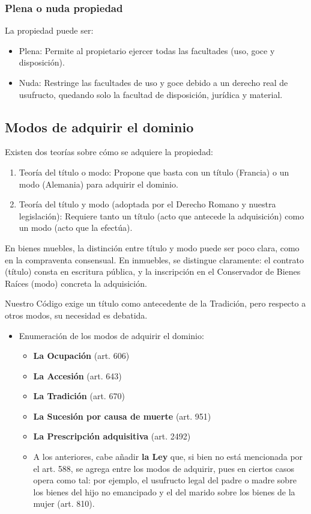 \documentclass{templateNote}
\begin{document}
\subsubsection{Plena o nuda propiedad}
La propiedad puede ser:
\begin{itemize}
    \item Plena: Permite al propietario ejercer todas las facultades (uso, goce y disposición).
    \item Nuda: Restringe las facultades de uso y goce debido a un derecho real de usufructo, quedando solo la facultad de disposición, jurídica y material.
\end{itemize}

\subsection{Modos de adquirir el dominio}

Existen dos teorías sobre cómo se adquiere la propiedad:  

\begin{enumerate}
    \item Teoría del título o modo: Propone que basta con un título (Francia) o un modo (Alemania) para adquirir el dominio.  
    \item Teoría del título y modo (adoptada por el Derecho Romano y nuestra legislación): Requiere tanto un título (acto que antecede la adquisición) como un modo (acto que la efectúa).  
\end{enumerate}

En bienes muebles, la distinción entre título y modo puede ser poco clara, como en la compraventa consensual. En inmuebles, se distingue claramente: el contrato (título) consta en escritura pública, y la inscripción en el Conservador de Bienes Raíces (modo) concreta la adquisición.  

Nuestro Código exige un título como antecedente de la Tradición, pero respecto a otros modos, su necesidad es debatida.

\begin{itemize}
    \item Enumeración de los modos de adquirir el dominio:
    \begin{itemize}
        \item \textbf{La Ocupación} (art. 606)
        \item \textbf{La Accesión} (art. 643)
        \item \textbf{La Tradición} (art. 670)
        \item \textbf{La Sucesión por causa de muerte} (art. 951)
        \item \textbf{La Prescripción adquisitiva} (art. 2492)
        \item A los anteriores, cabe añadir \textbf{la Ley} que, si bien no está mencionada por el art. 588, se agrega entre los modos de adquirir, pues en ciertos casos opera como tal: por ejemplo, el usufructo legal del padre o madre sobre los bienes del hijo no emancipado y el del marido sobre los bienes de la mujer (art. 810). 
    \end{itemize}
\end{itemize}
\end{document}
